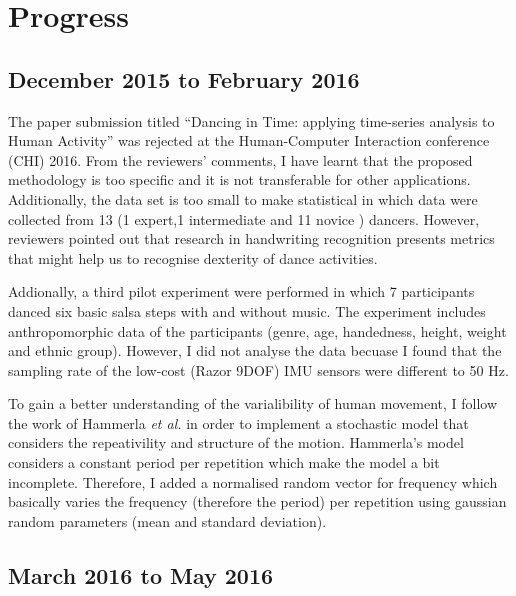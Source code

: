\documentclass[10pt,journal,onecolumn,compsoc]{IEEEtran}
\begin{document}
\section{Progress}



\subsection{December 2015 to February 2016}
The paper submission titled ``Dancing in Time: applying time-series analysis to Human Activity''
was rejected at the Human-Computer Interaction conference (CHI) 2016. From the reviewers' comments, 
I have learnt that the proposed methodology is too specific and it is not transferable for other applications.
Additionally, the data set is too small to make statistical in which 
data were collected from 13 (1 expert,1 intermediate and 11 novice ) dancers.
However, reviewers pointed out that research in handwriting recognition presents metrics 
that might help us to recognise dexterity of dance activities.

Addionally, a third pilot experiment were performed in which 7 participants danced 
six basic salsa steps with and without music.
The experiment includes anthropomorphic data of the participants 
(genre, age, handedness, height, weight and ethnic group).
However, I did not analyse the data becuase I found that the
 sampling rate of the low-cost (Razor 9DOF) IMU sensors were different to 50 Hz.

To gain a better understanding of the varialibility of human movement,
I follow the work of Hammerla  \textit{et al.} \cite{Hammerla2011} in order to implement a stochastic model 
that considers the repeativility and structure of the motion.
Hammerla's model considers a constant period per repetition which make the model a bit incomplete.
Therefore, I added a normalised random vector for frequency which basically varies the frequency 
(therefore the period) per repetition using gaussian random parameters (mean and standard deviation).

\subsection{March 2016 to May 2016}
\end{document}

